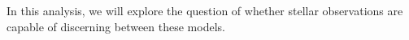 
In this analysis, we will explore the question of whether stellar observations %
are capable of 
discerning 
between these models. 

